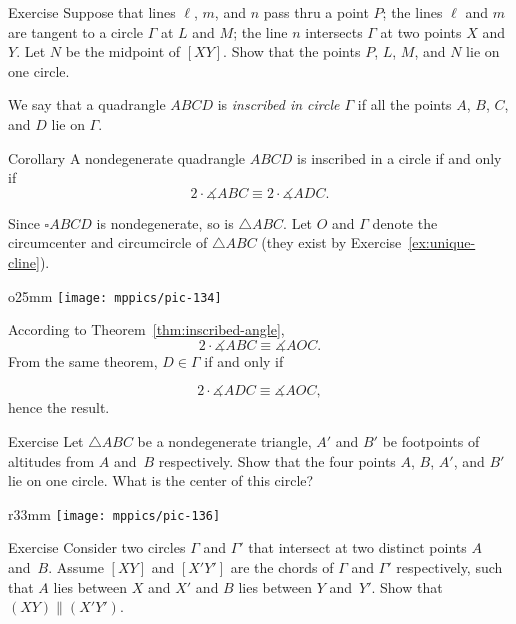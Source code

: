 \begin{thm}{Exercise}\label{ex:tnagents+midpoint}
Suppose that lines $\ell$, $m$, and $n$ pass thru a point $P$;
the lines $\ell$ and $m$ are tangent to a circle $\Gamma$ at $L$ and $M$;
the line $n$ intersects $\Gamma$ at two points $X$ and $Y$.
Let $N$ be the midpoint of $[XY]$.
Show that the points $P$, $L$, $M$, and $N$ lie on one circle.
\end{thm}

We say that a quadrangle $ABCD$ is 
\emph{inscribed in circle $\Gamma$}
if all the points $A$, $B$, $C$, and $D$ lie on $\Gamma$.

\begin{thm}{Corollary}\label{cor:inscribed-quadrangle}
A nondegenerate quadrangle $ABCD$ is inscribed in a circle if and only if 
\[2\cdot\measuredangle ABC\equiv 2\cdot\measuredangle ADC.\]

\end{thm}

Since $\square ABCD$ is nondegenerate, so is $\triangle ABC$.
Let $O$ and $\Gamma$ denote the circumcenter and circumcircle of $\triangle ABC$ (they exist by Exercise~\ref{ex:unique-cline}).

{

\begin{wrapfigure}[10]{o}{25mm}
\vskip-1mm
\centering
\texttt{[image: mppics/pic-134]}
\end{wrapfigure}

According to Theorem~\ref{thm:inscribed-angle},
$$
2\cdot\measuredangle ABC
\equiv
\measuredangle AOC.
$$
From the same theorem, $D\in\Gamma$ if and only if 

$$
2\cdot\measuredangle ADC
\equiv\measuredangle AOC,
$$
hence the result.
\qeds

}


{

\begin{thm}{Exercise}\label{ex:VVAA}
Let $\triangle A B C$ be a nondegenerate triangle,
$A'$ and $B'$ be footpoints of altitudes from $A$ and~$B$ respectively.
Show that the four points $A$, $B$, $A'$, and $B'$ lie on one circle.
What is the center of this circle?
\end{thm}

\begin{wrapfigure}{r}{33mm}
\vskip-0mm
\centering
\texttt{[image: mppics/pic-136]}
\end{wrapfigure}

\begin{thm}{Exercise}\label{ex:secant-circles}
Consider two circles $\Gamma$ and $\Gamma'$ that intersect at two distinct points $A$ and~$B$.
Assume $[XY]$ and $[X'Y']$ are the chords of $\Gamma$ and $\Gamma'$ respectively,
such that $A$ lies between $X$ and $X'$ and $B$ lies between $Y$ and~$Y'$.
Show that $(XY)\parallel (X'Y')$.
\end{thm}

}


